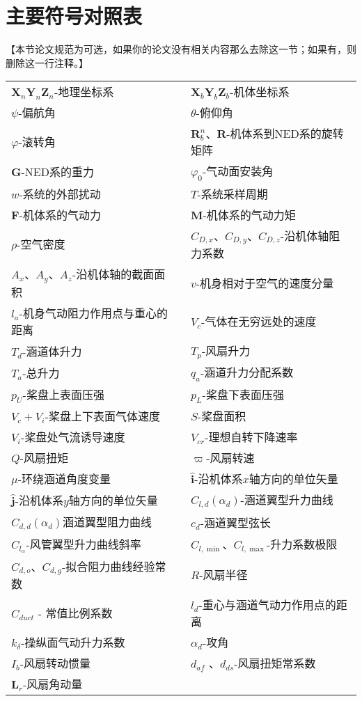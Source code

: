 \chapter{主要符号对照表}
【本节论文规范为可选，如果你的论文没有相关内容那么去除这一节；如果有，则删除这一行注释。】
\begin{table}
	\centering{}%
	\begin{tabular}{l>{\centering}p{0.5cm}l}
	 $ \bm{X}_n\bm{Y}_n\bm{Z}_n $-地理坐标系           &  & ${\bm{X}_b}{\bm{Y}_b}{\bm{Z}_b}$-机体坐标系\tabularnewline
	 $ \psi $-偏航角								   &  & $\theta$-俯仰角\tabularnewline
	 $\varphi$-滚转角  							   &  & $\bm{R}^n_b$、$\bm{R}$-机体系到NED系的旋转矩阵\tabularnewline
	 $\bm{G}$-NED系的重力  							  &  &   $\varphi_0 $-气动面安装角\tabularnewline
	 $ w $-系统的外部扰动								&  &  $T$-系统采样周期\tabularnewline
	 $\bm{F}$-机体系的气动力 						    &  &   $\bm{M}$-机体系的气动力矩\tabularnewline
	 $\rho$-空气密度 								  &  &  $C_{D,x} $、$ C_{D,y} $、$ C_{D,z} $-沿机体轴阻力系数\tabularnewline
	 $A_x $、$ A_y $、$ A_z $-沿机体轴的截面面积 		 &  &  $v$-机身相对于空气的速度分量\tabularnewline 
	 $l_{a}$-机身气动阻力作用点与重心的距离   			  &  &  $V_c$-气体在无穷远处的速度\tabularnewline
	 $T_d$-涵道体升力  								 &  &  $T_p$-风扇升力\tabularnewline
	 $T_a$-总升力 								      &  &  $q_a$-涵道升力分配系数\tabularnewline
	 $ p_U $-桨盘上表面压强 						   &  &  $p_L$-桨盘下表面压强\tabularnewline
	 $V_c+V_i$-桨盘上下表面气体速度 					 &  &  $S$-桨盘面积\tabularnewline
	 $ V_i $-桨盘处气流诱导速度 						  &  &  $ V_{cr} $-理想自转下降速率\tabularnewline
	 $ Q $-风扇扭矩 								 &  &  $ \varpi $-风扇转速\tabularnewline
	 $\mu$-环绕涵道角度变量 						  &  &  $\hat{\bm{i}}$-沿机体系$x$轴方向的单位矢量\tabularnewline 
	 $\hat{\bm{j}}$-沿机体系$y$轴方向的单位矢量  	   &  &  $C_{l, d}(\alpha_d)$-涵道翼型升力曲线\tabularnewline 
	 $C_{d, d}(\alpha_d)$涵道翼型阻力曲线  		      &  &  $c_d$-涵道翼型弦长\tabularnewline 
	 $C_{l_{\alpha}}$-风管翼型升力曲线斜率  			 &  &  $C_{l, \min }$、$ C_{l, \max } $-升力系数极限\tabularnewline 
	 $C_{d, o }$、$C_{d, g }$-拟合阻力曲线经验常数 	&  &  $R$-风扇半径\tabularnewline 
	 $C_{d u c t}$ - 常值比例系数  					&  &  $l_{d}$-重心与涵道气动力作用点的距离\tabularnewline
	 $k_{\delta}$-操纵面气动升力系数 				 &  &  $\alpha_d$-攻角\tabularnewline
	 $ I_{b}$-风扇转动惯量  						   &  &  $ d_{af} $ 、$ d_{ds} $-风扇扭矩常系数\tabularnewline
	 $\bm{L}_{{r}}$-风扇角动量  						&  & \tabularnewline 					
	\end{tabular}
\end{table}
